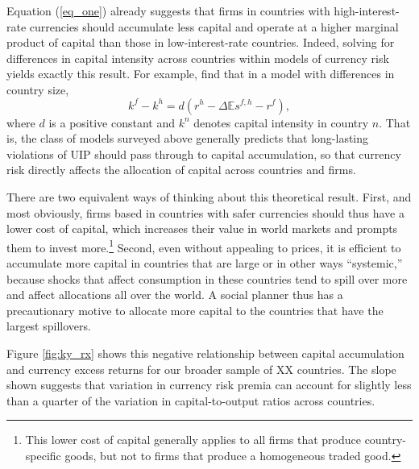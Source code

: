 \documentclass{ar-1col}
\begin{document}
Equation (\ref{eq_one}) already suggests that firms in countries with high-interest-rate currencies should accumulate less capital and operate at a higher marginal product of capital than those in low-interest-rate countries. Indeed, solving for differences in capital intensity across countries within models of currency risk yields exactly this result. For example, \citet{HassanMertensZhang2015} find that in a model with differences in country size,  
\begin{equation}
    k^f - k^h = d
    \left(r^h - \Delta \mathbb{E} s^{f, h} - r^f \right),
\end{equation}
where $d$ is a positive constant and $k^n$ denotes capital intensity in country $n$. That is, the class of models surveyed above generally predicts that long-lasting violations of UIP should pass through to capital accumulation, so that currency risk directly affects the allocation of capital across countries and firms.

There are two equivalent ways of thinking about this theoretical result. First, and most obviously, firms based in countries with safer currencies should thus have a lower cost of capital, which increases their value in world markets and prompts them to
invest more.\footnote{This lower cost of capital generally applies to all firms that produce country-specific goods, but not to firms that produce a homogeneous traded good.} 
Second, even without appealing to prices, it is efficient to accumulate more capital in countries that are large or in other ways ``systemic,'' because shocks that affect consumption in these countries tend to spill over more and affect allocations all over the world. A social planner thus has a precautionary motive to allocate more capital to the countries that have the largest spillovers.


Figure \ref{fig:ky_rx} shows this negative relationship between capital accumulation and currency excess returns for our broader sample of XX countries. The slope shown suggests that variation in currency risk premia can account for slightly less than a quarter of the variation in capital-to-output ratios across countries.
\end{document}
